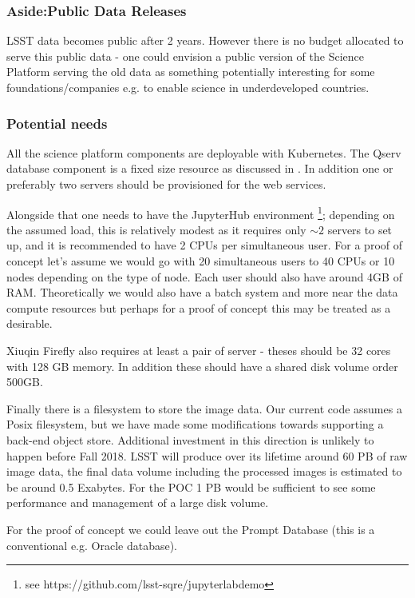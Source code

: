 \subsubsection {Aside:Public Data Releases}
LSST data becomes public after 2 years. However there is no budget allocated to serve this public data - one could envision a public version of the Science Platform serving the old data as something potentially interesting for some foundations/companies e.g. to enable science in underdeveloped countries.

\subsubsection {Potential needs}
All the science platform components are deployable with Kubernetes.   The Qserv database component is a fixed size resource as discussed in .
In addition one or preferably two servers should be provisioned for the  web services.

Alongside that one needs to have the JupyterHub environment \footnote{see https://github.com/lsst-sqre/jupyterlabdemo}; depending on the assumed load, this is relatively modest as it requires only $\sim2$ servers to set up, and it is recommended to have 2 CPUs per simultaneous user. For a proof of concept let's assume we would go with 20 simultaneous users to 40 CPUs or 10 nodes depending on the type of node. Each user should also have around 4GB of RAM.
Theoretically we would also have a batch system and more near the data compute resources but perhaps for a proof of concept this may be treated as a desirable.

{\color{red} Xiuqin }
Firefly also requires at least a pair of  server - theses should be 32 cores
with 128 GB memory. In addition these should have a shared disk volume order 500GB.

Finally there is a filesystem to store the image data. Our current code assumes a Posix filesystem, but we have made some modifications towards supporting a back-end object store. Additional investment in this direction is unlikely to happen before Fall 2018. LSST will produce over its lifetime around 60 PB of raw image data,  the final data volume including the processed images is estimated to be around 0.5 Exabytes.  For the POC 1 PB would be sufficient to see some performance and management of a large disk volume.

For the proof of concept we could leave out the Prompt Database (this is a conventional e.g. Oracle database).

